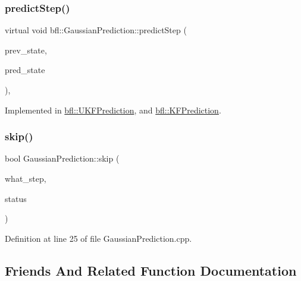 \subsubsection{\texorpdfstring{predict\+Step()}{predictStep()}}
{\footnotesize\ttfamily virtual void bfl\+::\+Gaussian\+Prediction\+::predict\+Step (\begin{DoxyParamCaption}\item[{const \mbox{\hyperlink{classbfl_1_1GaussianMixture}{Gaussian\+Mixture}} \&}]{prev\+\_\+state,  }\item[{\mbox{\hyperlink{classbfl_1_1GaussianMixture}{Gaussian\+Mixture}} \&}]{pred\+\_\+state }\end{DoxyParamCaption})\hspace{0.3cm}{\ttfamily [protected]}, {}}



Implemented in \mbox{\hyperlink{classbfl_1_1UKFPrediction_a0ffba56fa1aa4d71c6872e1d76bd2f02}{bfl\+::\+U\+K\+F\+Prediction}}, and \mbox{\hyperlink{classbfl_1_1KFPrediction_aa71d6b8ac030c54e86d3e91a94bb2db9}{bfl\+::\+K\+F\+Prediction}}.

\mbox{\label{classbfl_1_1GaussianPrediction_ae647821cf920ea81f981ebc9260cdbe6}} 
\subsubsection{\texorpdfstring{skip()}{skip()}}
{\footnotesize\ttfamily bool Gaussian\+Prediction\+::skip (\begin{DoxyParamCaption}\item[{const std\+::string \&}]{what\+\_\+step,  }\item[{const bool}]{status }\end{DoxyParamCaption})}



Definition at line 25 of file Gaussian\+Prediction.\+cpp.



\subsection{Friends And Related Function Documentation}
\mbox{\label{classbfl_1_1GaussianPrediction_a6270a27fe93ac0118907f8cbd64005c8}} 

